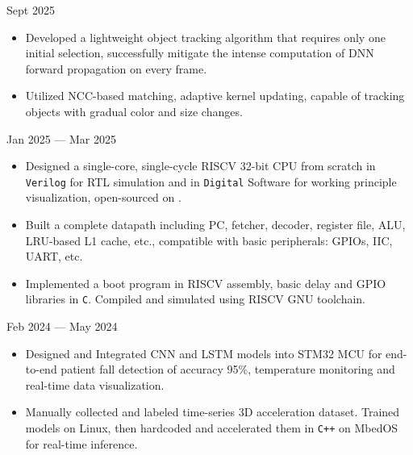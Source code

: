  \hfill Sept 2025

\begin{itemize}
    \setlength\itemsep{-0.5em}
    \setlength\topsep{0pt}
    \setlength\partopsep{0pt}
    \item Developed a lightweight object tracking algorithm that requires only one initial selection, successfully mitigate the intense computation of DNN forward propagation on every frame.
    \item Utilized NCC-based matching, adaptive kernel updating, capable of tracking objects with gradual color and size changes.
\end{itemize}

 \hfill Jan 2025 --- Mar 2025

\begin{itemize}
    \setlength\itemsep{-0.5em}
    \setlength\topsep{0pt}
    \setlength\partopsep{0pt}
    \item Designed a single-core, single-cycle RISCV 32-bit CPU from scratch in \texttt{Verilog} for RTL simulation and in \texttt{Digital} Software for working principle visualization, open-sourced on .
    \item Built a complete datapath including PC, fetcher, decoder, register file, ALU, LRU-based L1 cache, etc., compatible with basic peripherals: GPIOs, IIC, UART, etc.
    \item Implemented a boot program in RISCV assembly, basic delay and GPIO libraries in \texttt{C}. Compiled and simulated using RISCV GNU toolchain.
\end{itemize}

 \hfill Feb 2024 --- May 2024

\begin{itemize}
    \setlength\itemsep{-0.5em}
    \setlength\topsep{0pt}
    \setlength\partopsep{0pt}
    \item Designed and Integrated CNN and LSTM models into STM32 MCU for end-to-end patient fall detection of accuracy 95\%, temperature monitoring and real-time data visualization.
    \item Manually collected and labeled time-series 3D acceleration dataset. Trained models on Linux, then hardcoded and accelerated them in \texttt{C++} on MbedOS for real-time inference.
\end{itemize}



